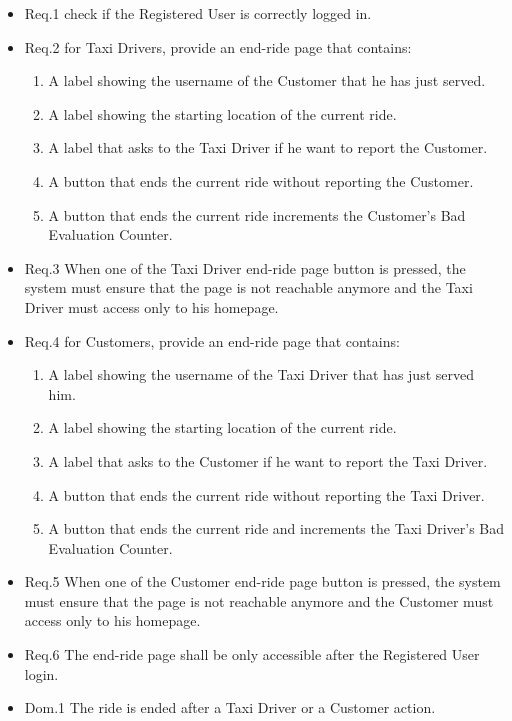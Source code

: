 				\begin{itemize}
					\item \lbrack Req.1\rbrack \label{sec:fr1_g7} check if the Registered User is correctly logged in.
					\item \lbrack Req.2\rbrack \label{sec:fr2_g7} for Taxi Drivers, provide an end-ride page that contains:
						\begin{enumerate}
							\item A label showing the username of the Customer that he has just served.
							\item A label showing the starting location of the current ride.
							\item A label that asks to the Taxi Driver if he want to report the Customer.
							\item A button that ends the current ride without reporting the Customer.
							\item A button that ends the current ride increments the Customer's Bad Evaluation Counter.
						\end{enumerate}
					\item \lbrack Req.3\rbrack \label{sec:fr3_g7} When one of the Taxi Driver end-ride page button is pressed, the system must ensure that the page is not reachable anymore and the Taxi Driver must access only to his homepage.
					\\
					\item \lbrack Req.4\rbrack \label{sec:fr4_g7} for Customers, provide an end-ride page that contains:
						\begin{enumerate}
							\item A label showing the username of the Taxi Driver that has just served him.
							\item A label showing the starting location of the current ride.
							\item A label that asks to the Customer if he want to report the Taxi Driver.
							\item A button that ends the current ride without reporting the Taxi Driver.
							\item A button that ends the current ride and increments the Taxi Driver's Bad Evaluation Counter.
						\end{enumerate}
					\item \lbrack Req.5\rbrack \label{sec:fr5_g7} When one of the Customer end-ride page button is pressed, the system must ensure that the page is not reachable anymore and the Customer must access only to his homepage.
					\item \lbrack Req.6\rbrack \label{sec:fr6_g7} The end-ride page shall be only accessible after the Registered User login.
					\item \lbrack Dom.1\rbrack \label{sec:da1_g7} The ride is ended after a Taxi Driver or a Customer action.
				\end{itemize}

